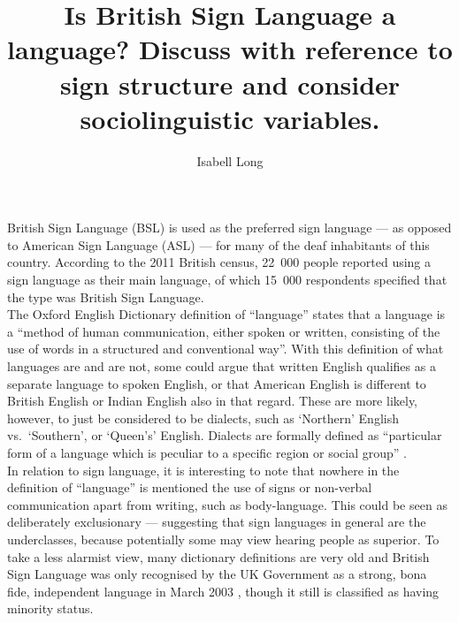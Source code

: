 \documentclass[12pt]{article}
\begin{document}
\title{\small{Is British Sign Language a language? Discuss with
              reference to sign structure and consider sociolinguistic
              variables.}}
\author{Isabell Long}
\maketitle

British Sign Language (BSL) is used as the preferred sign language ---
as opposed to American Sign Language (ASL) --- for many of the deaf
inhabitants of this country. According to the 2011 British
census\nocite{2011-census}, 22~000 people reported using a sign
language as their main language, of which 15~000 respondents specified
that the type was British Sign Language.\\

The Oxford English Dictionary definition of ``language'' states that a
language is a ``method of human communication, either spoken or
written, consisting of the use of words in a structured and
conventional way''. With this definition of what languages are and
are not, some could argue that written English qualifies as a separate
language to spoken English, or that American English is different to
British English or Indian English also in that regard. These are more
likely, however, to just be considered to be dialects, such as
`Northern' English vs.\ `Southern', or `Queen's' English. Dialects are
formally defined as ``particular form of a language which is peculiar
to a specific region or social group'' \citep{oed-dialect}.\\

In relation to sign language, it is interesting to note that nowhere
in the definition of ``language'' is mentioned the use of signs or
non-verbal communication apart from writing, such as body-language.
This could be seen as deliberately exclusionary --- suggesting that
sign languages in general are the underclasses, because potentially
some may view hearing people as superior. To take a less alarmist
view, many dictionary definitions are very old and British Sign
Language was only recognised by the UK Government as a strong,
bona fide, independent language in March 2003 \citep{gov-guidance-bsl},
though it still is classified as having minority status.\\
\end{document}
